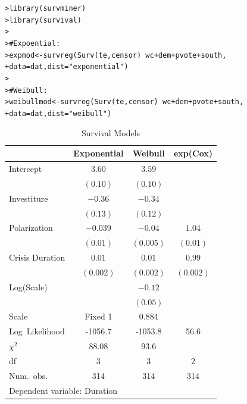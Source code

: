 \documentclass[12pt]{article}\usepackage[]{graphicx}\usepackage[]{color}
\makeatletter
\newcommand{\hlstr}[1]{\textcolor[rgb]{0.82,0.78,0.62}{#1}}%
\newcommand{\hlcom}[1]{\textcolor[rgb]{0.404,0.408,0.42}{#1}}%
\newcommand{\hlopt}[1]{\textcolor[rgb]{0.882,0.878,0.898}{#1}}%
\newcommand{\hlstd}[1]{\textcolor[rgb]{0.882,0.878,0.898}{#1}}%
\newcommand{\hlkwb}[1]{\textcolor[rgb]{0.902,0.675,0.196}{#1}}%
\newcommand{\hlkwc}[1]{\textcolor[rgb]{0.812,0.522,0.388}{#1}}%
\newcommand{\hlkwd}[1]{\textcolor[rgb]{0.733,0.388,0.812}{#1}}%
\newenvironment{kframe}{%
 \def\at@end@of@kframe{}%
 \ifinner\ifhmode%
  \def\at@end@of@kframe{\end{minipage}}%
  \begin{minipage}{\columnwidth}%
 \fi\fi%
 \def\FrameCommand##1{\hskip\@totalleftmargin \hskip-\fboxsep
 \colorbox{shadecolor}{##1}\hskip-\fboxsep
     \hskip-\linewidth \hskip-\@totalleftmargin \hskip\columnwidth}%
 \MakeFramed {\advance\hsize-\width
   \@totalleftmargin\z@ \linewidth\hsize
   \@setminipage}}%
 {\par\unskip\endMakeFramed%
 \at@end@of@kframe}
\newenvironment{knitrout}{}{} %
\makeatother
\begin{document}
\begin{flushleft}
\begin{knitrout}
\color{fgcolor}\begin{kframe}
\begin{alltt}
\hlstd{> }\hlkwd{library}\hlstd{(survminer)}
\hlstd{> }\hlkwd{library}\hlstd{(survival)}
\hlstd{> }
\hlstd{> }\hlcom{# Expoential:}
\hlstd{> }\hlstd{expmod} \hlkwb{<-} \hlkwd{survreg}\hlstd{(}\hlkwd{Surv}\hlstd{(te, censor)} \hlopt{~} \hlstd{wc} \hlopt{+} \hlstd{dem} \hlopt{+} \hlstd{pvote} \hlopt{+} \hlstd{south,}
\hlstd{+ }                  \hlkwc{data} \hlstd{= dat,} \hlkwc{dist} \hlstd{=} \hlstr{"exponential"}\hlstd{)}
\hlstd{> }
\hlstd{> }\hlcom{# Weibull:}
\hlstd{> }\hlstd{weibullmod} \hlkwb{<-} \hlkwd{survreg}\hlstd{(}\hlkwd{Surv}\hlstd{(te, censor)} \hlopt{~} \hlstd{wc} \hlopt{+} \hlstd{dem} \hlopt{+} \hlstd{pvote} \hlopt{+} \hlstd{south,}
\hlstd{+ }                  \hlkwc{data} \hlstd{= dat,} \hlkwc{dist} \hlstd{=} \hlstr{"weibull"}\hlstd{)}
\end{alltt}
\end{kframe}
\end{knitrout}



\begin{table}[h!]
\caption{Survival Models}
\begin{center}
\begin{tabular}{l c c c }
\hline
 & Exponential & Weibull & exp(Cox) \\
\hline
Intercept          & $3.60$    & $3.59$    &           \\
                   & $(0.10)$  & $(0.10)$  &           \\
Investiture        & $-0.36$   & $-0.34$   &           \\
                   & $(0.13)$  & $(0.12)$  &           \\
Polarization       & $-0.039$  & $-0.04$   & $1.04$    \\
                   & $(0.01)$  & $(0.005)$ & $(0.01)$  \\
Crisis Duration    & $0.01$    & $0.01$    & $0.99$    \\
                   & $(0.002)$ & $(0.002)$ & $(0.002)$ \\
Log(Scale)         &           & $-0.12$   &           \\
                   &           & $(0.05)$  &           \\

\hline
Scale              & Fixed 1   & 0.884     &         \\
Log\ Likelihood    & -1056.7   & -1053.8   & 56.6    \\
$\chi^2$           & 88.08     & 93.6      &         \\
df                 &  3        &   3       & 2       \\
Num.\ obs.         & 314       & 314       & 314     \\
\hline
\multicolumn{4}{l}{\scriptsize{Dependent variable: Duration}}
\end{tabular}
\end{center}
\end{table}


\end{flushleft}
\end{document}
